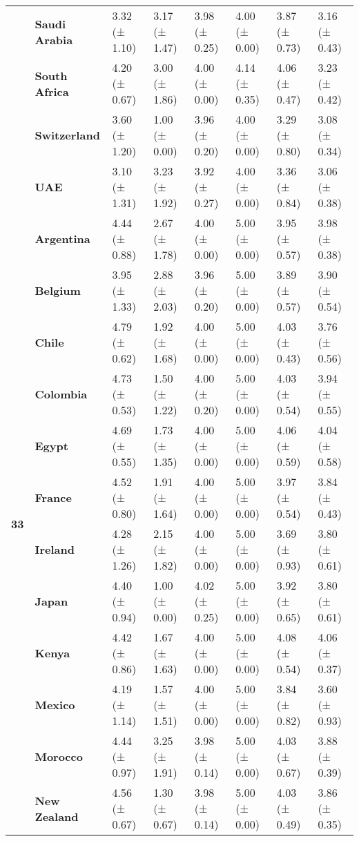 \begin{longtable}{llllllll}
\textbf{} & \textbf{Saudi Arabia} & 3.32 (± 1.10) & 3.17 (± 1.47) & 3.98 (± 0.25) & 4.00 (± 0.00) & 3.87 (± 0.73) & 3.16 (± 0.43) \\
\textbf{} & \textbf{South Africa} & 4.20 (± 0.67) & 3.00 (± 1.86) & 4.00 (± 0.00) & 4.14 (± 0.35) & 4.06 (± 0.47) & 3.23 (± 0.42) \\
\textbf{} & \textbf{Switzerland} & 3.60 (± 1.20) & 1.00 (± 0.00) & 3.96 (± 0.20) & 4.00 (± 0.00) & 3.29 (± 0.80) & 3.08 (± 0.34) \\
\textbf{} & \textbf{UAE} & 3.10 (± 1.31) & 3.23 (± 1.92) & 3.92 (± 0.27) & 4.00 (± 0.00) & 3.36 (± 0.84) & 3.06 (± 0.38) \\
\cline{1-8}
\multirow[t]{19}{*}{\textbf{33}} & \textbf{Argentina} & 4.44 (± 0.88) & 2.67 (± 1.78) & 4.00 (± 0.00) & 5.00 (± 0.00) & 3.95 (± 0.57) & 3.98 (± 0.38) \\
\textbf{} & \textbf{Belgium} & 3.95 (± 1.33) & 2.88 (± 2.03) & 3.96 (± 0.20) & 5.00 (± 0.00) & 3.89 (± 0.57) & 3.90 (± 0.54) \\
\textbf{} & \textbf{Chile} & 4.79 (± 0.62) & 1.92 (± 1.68) & 4.00 (± 0.00) & 5.00 (± 0.00) & 4.03 (± 0.43) & 3.76 (± 0.56) \\
\textbf{} & \textbf{Colombia} & 4.73 (± 0.53) & 1.50 (± 1.22) & 4.00 (± 0.20) & 5.00 (± 0.00) & 4.03 (± 0.54) & 3.94 (± 0.55) \\
\textbf{} & \textbf{Egypt} & 4.69 (± 0.55) & 1.73 (± 1.35) & 4.00 (± 0.00) & 5.00 (± 0.00) & 4.06 (± 0.59) & 4.04 (± 0.58) \\
\textbf{} & \textbf{France} & 4.52 (± 0.80) & 1.91 (± 1.64) & 4.00 (± 0.00) & 5.00 (± 0.00) & 3.97 (± 0.54) & 3.84 (± 0.43) \\
\textbf{} & \textbf{Ireland} & 4.28 (± 1.26) & 2.15 (± 1.82) & 4.00 (± 0.00) & 5.00 (± 0.00) & 3.69 (± 0.93) & 3.80 (± 0.61) \\
\textbf{} & \textbf{Japan} & 4.40 (± 0.94) & 1.00 (± 0.00) & 4.02 (± 0.25) & 5.00 (± 0.00) & 3.92 (± 0.65) & 3.80 (± 0.61) \\
\textbf{} & \textbf{Kenya} & 4.42 (± 0.86) & 1.67 (± 1.63) & 4.00 (± 0.00) & 5.00 (± 0.00) & 4.08 (± 0.54) & 4.06 (± 0.37) \\
\textbf{} & \textbf{Mexico} & 4.19 (± 1.14) & 1.57 (± 1.51) & 4.00 (± 0.00) & 5.00 (± 0.00) & 3.84 (± 0.82) & 3.60 (± 0.93) \\
\textbf{} & \textbf{Morocco} & 4.44 (± 0.97) & 3.25 (± 1.91) & 3.98 (± 0.14) & 5.00 (± 0.00) & 4.03 (± 0.67) & 3.88 (± 0.39) \\
\textbf{} & \textbf{New Zealand} & 4.56 (± 0.67) & 1.30 (± 0.67) & 3.98 (± 0.14) & 5.00 (± 0.00) & 4.03 (± 0.49) & 3.86 (± 0.35) \\

\end{longtable}
